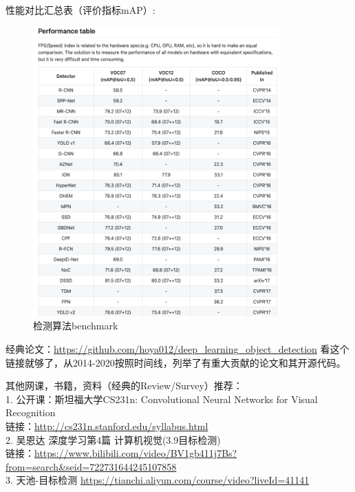 \documentclass[lang=cn,11pt,a4paper]{elegant_template}
\begin{document}
性能对比汇总表（评价指标mAP）:
\begin{figure}[htbp]
  \centering
  \includegraphics[width=0.85\textwidth]{image/cv_5.png}
  \caption{检测算法benchmark}
\end{figure}

\hfill 

经典论文：\href{https://github.com/hoya012/deep_learning_object_detection}{https://github.com/hoya012/deep\_learning\_object\_detection}
看这个链接就够了，从2014-2020按照时间线，列举了有重大贡献的论文和其开源代码。

\hfill 

其他网课，书籍，资料（经典的Review/Survey）推荐：\\
1.	公开课：斯坦福大学CS231n: Convolutional Neural Networks for Visual Recognition\\
链接：\href{http://cs231n.stanford.edu/syllabus.html}{http://cs231n.stanford.edu/syllabus.html}\\
2.	吴恩达 深度学习第4篇 计算机视觉(3.9目标检测)\\
链接：\href{https://www.bilibili.com/video/BV1gb411j7Bs?from=search&seid=722731644245107858}{https://www.bilibili.com/video/BV1gb411j7Bs?from=search\&seid=722731644245107858}\\
3.	天池-目标检测 \href{https://tianchi.aliyun.com/course/video?liveId=41141}{https://tianchi.aliyun.com/course/video?liveId=41141}
\end{document}
